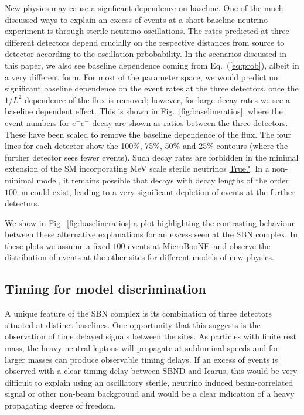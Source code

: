 \documentclass[11pt, a4paper]{article}
\newcommand{\refeq}[1]{Eq.~(\ref{#1})}
\newcommand{\reffig}[1]{Fig.~\ref{#1}}
\def\muboone{MicroBooNE}
\newcommand{\newtext}[2]{\textcolor{#1}{\ul{#2}}}
\begin{document}
New physics may cause a signficant dependence on baseline. One of the much
discussed ways to explain an excess of events at a short baseline neutrino
experiment is through sterile neutrino oscillations. The rates predicted at
three different detectors depend crucially on the respective distances from
source to detector according to the oscillation prbobability. In the scenarios
discussed in this paper, we also see baseline dependence coming from
\refeq{eq:prob}, albeit in a very different form. For most of the parameter
space, we would predict no significant baseline dependence on the event rates
at the three detectors, once the $1/L^2$ dependence of the flux is removed;
however, for large decay rates we see a baseline dependent effect. This is
shown in \reffig{fig:baselineratios}, where the event numbers for $e^-e^-$
decay are shown as ratios between the three detectors. These have been scaled
to remove the baseline dependence of the flux.  The four lines for each
detector show the 100\%, 75\%, 50\% and 25\% contours (where the further
detector sees fewer events). Such decay rates are forbidden in the minimal
extension of the SM incorporating MeV scale sterile neutrinos
\newtext{PB}{True?}. In a non-minimal model, it remains possible that decays
with decay lengths of the order $100$~m could exist, leading to a very 
significant depletion of events at the further detectors.

We show in \reffig{fig:baselineratios} a plot highlighting the contrasting
behaviour between these alternative explanations for an excess seen at the SBN
complex. In these plots we assume a fixed $100$ events at \muboone\ and observe
the distribution of events at the other sites for different models of new
physics.

\subsection{\label{sec:timing_physics}Timing for model discrimination}

A unique feature of the SBN complex is its combination of three detectors
situated at distinct baselines. One opportunity that this suggests is the
observation of time delayed signals between the sites. As particles with finite
rest mass, the heavy neutral leptons will propagate at subluminal speeds and
for larger masses can produce observable timing delays. If an excess of events
is observed with a clear timing delay between SBND and Icarus, this would be
very difficult to explain using an oscillatory sterile, neutrino induced
beam-correlated signal or other non-beam background and would be a clear
indication of a heavy propagating degree of freedom. 
\end{document}
